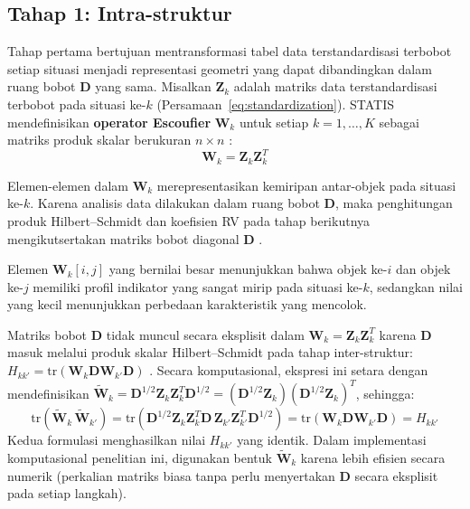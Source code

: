 \subsection{\normalsize Tahap 1: Intra-struktur}

Tahap pertama bertujuan mentransformasi tabel data terstandardisasi terbobot setiap situasi menjadi representasi geometri yang dapat dibandingkan dalam ruang bobot $\mathbf{D}$ yang sama. Misalkan $\mathbf{Z}_k$ adalah matriks data terstandardisasi terbobot pada situasi ke-$k$ (Persamaan~\ref{eq:standardization}). STATIS mendefinisikan \textbf{operator Escoufier} $\mathbf{W}_k$ untuk setiap $k = 1, \dots, K$ sebagai matriks produk skalar berukuran $n \times n$ \citep{lavit94}:
\begin{equation}\label{eq:intra}
  \mathbf{W}_k = \mathbf{Z}_k \mathbf{Z}_k^T
\end{equation}

Elemen-elemen dalam $\mathbf{W}_k$ merepresentasikan kemiripan antar-objek pada situasi ke-$k$. Karena analisis data dilakukan dalam ruang bobot $\mathbf{D}$, maka penghitungan produk Hilbert--Schmidt dan koefisien RV pada tahap berikutnya mengikutsertakan matriks bobot diagonal $\mathbf{D}$ \citep{lavit94}.

\begin{remark}
  Elemen $\mathbf{W}_k[i,j]$ yang bernilai besar menunjukkan bahwa objek ke-$i$ dan objek ke-$j$ memiliki profil indikator yang sangat mirip pada situasi ke-$k$, sedangkan nilai yang kecil menunjukkan perbedaan karakteristik yang mencolok.
\end{remark}

\begin{remark}
  Matriks bobot $\mathbf{D}$ tidak muncul secara eksplisit dalam $\mathbf{W}_k = \mathbf{Z}_k\mathbf{Z}_k^T$ karena $\mathbf{D}$ masuk melalui produk skalar Hilbert--Schmidt pada tahap inter-struktur: $H_{kk'} = \mathrm{tr}(\mathbf{W}_k\mathbf{D}\mathbf{W}_{k'}\mathbf{D})$ \citep{lavit94}. Secara komputasional, ekspresi ini setara dengan mendefinisikan $\widetilde{\mathbf{W}}_k = \mathbf{D}^{1/2}\mathbf{Z}_k\mathbf{Z}_k^T\mathbf{D}^{1/2} = (\mathbf{D}^{1/2}\mathbf{Z}_k)(\mathbf{D}^{1/2}\mathbf{Z}_k)^T$, sehingga:
  \[
    \mathrm{tr}(\widetilde{\mathbf{W}}_k\,\widetilde{\mathbf{W}}_{k'}) = \mathrm{tr}(\mathbf{D}^{1/2}\mathbf{Z}_k\mathbf{Z}_k^T\mathbf{D}\,\mathbf{Z}_{k'}\mathbf{Z}_{k'}^T\mathbf{D}^{1/2}) = \mathrm{tr}(\mathbf{W}_k\mathbf{D}\mathbf{W}_{k'}\mathbf{D}) = H_{kk'}
  \]
  Kedua formulasi menghasilkan nilai $H_{kk'}$ yang identik. Dalam implementasi komputasional penelitian ini, digunakan bentuk $\widetilde{\mathbf{W}}_k$ karena lebih efisien secara numerik (perkalian matriks biasa tanpa perlu menyertakan $\mathbf{D}$ secara eksplisit pada setiap langkah).
\end{remark}

